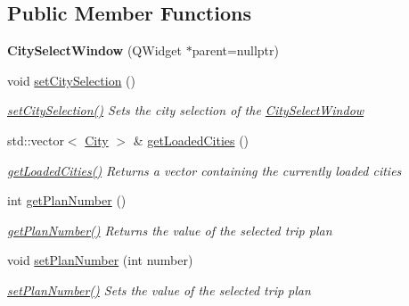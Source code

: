 \subsection*{Public Member Functions}
\begin{DoxyCompactItemize}
\item 
\mbox{\label{class_city_select_window_a7a259de30cddf3e5dc8835546ea2de65}} 
{\bfseries City\+Select\+Window} (Q\+Widget $\ast$parent=nullptr)
\item 
void \mbox{\hyperlink{class_city_select_window_a771b0feebb7c7fdb1714917b337a37f3}{set\+City\+Selection}} ()
\begin{DoxyCompactList}\small\item\em \mbox{\hyperlink{class_city_select_window_a771b0feebb7c7fdb1714917b337a37f3}{set\+City\+Selection()}} Sets the city selection of the \mbox{\hyperlink{class_city_select_window}{City\+Select\+Window}} \end{DoxyCompactList}\item 
std\+::vector$<$ \mbox{\hyperlink{class_city}{City}} $>$ \& \mbox{\hyperlink{class_city_select_window_a7a0aacdfc7b496f7b21cba7ab6311468}{get\+Loaded\+Cities}} ()
\begin{DoxyCompactList}\small\item\em \mbox{\hyperlink{class_city_select_window_a7a0aacdfc7b496f7b21cba7ab6311468}{get\+Loaded\+Cities()}} Returns a vector containing the currently loaded cities \end{DoxyCompactList}\item 
int \mbox{\hyperlink{class_city_select_window_a63048482e621b1653250c7acbd28c3aa}{get\+Plan\+Number}} ()
\begin{DoxyCompactList}\small\item\em \mbox{\hyperlink{class_city_select_window_a63048482e621b1653250c7acbd28c3aa}{get\+Plan\+Number()}} Returns the value of the selected trip plan \end{DoxyCompactList}\item 
void \mbox{\hyperlink{class_city_select_window_a6afffce8400f9541a3c31e0e359c0d9b}{set\+Plan\+Number}} (int number)
\begin{DoxyCompactList}\small\item\em \mbox{\hyperlink{class_city_select_window_a6afffce8400f9541a3c31e0e359c0d9b}{set\+Plan\+Number()}} Sets the value of the selected trip plan \end{DoxyCompactList}\item 

\end{DoxyCompactItemize}
